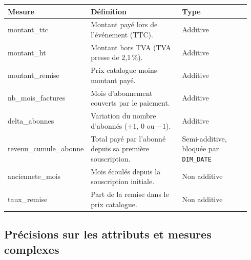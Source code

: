\documentclass[a4paper,12pt]{article}
\begin{document}
\begin{center}
\renewcommand{\arraystretch}{1.3}
\begin{tabular}{@{}p{0.24\linewidth}p{0.40\linewidth}p{0.30\linewidth}@{}}
  \toprule
  \textbf{Mesure} & \textbf{Définition} & \textbf{Type} \\
  \midrule
  montant\_ttc & Montant payé lors de l'événement (TTC). & Additive \\
  montant\_ht & Montant hors TVA (TVA presse de 2,1\,\%). & Additive \\
  montant\_remise & Prix catalogue moins montant payé. & Additive \\
  nb\_mois\_factures & Mois d'abonnement couverts par le paiement. & Additive \\
  delta\_abonnes & Variation du nombre d'abonnés ($+1$, $0$ ou $-1$). & Additive \\
  revenu\_cumule\_abonne & Total payé par l'abonné depuis sa première souscription. & Semi-additive, bloquée par \texttt{DIM\_DATE} \\
  anciennete\_mois & Mois écoulés depuis la souscription initiale. & Non additive \\
  taux\_remise & Part de la remise dans le prix catalogue. & Non additive \\
  \bottomrule
\end{tabular}
\end{center}

\subsection{Précisions sur les attributs et mesures complexes}
\end{document}
